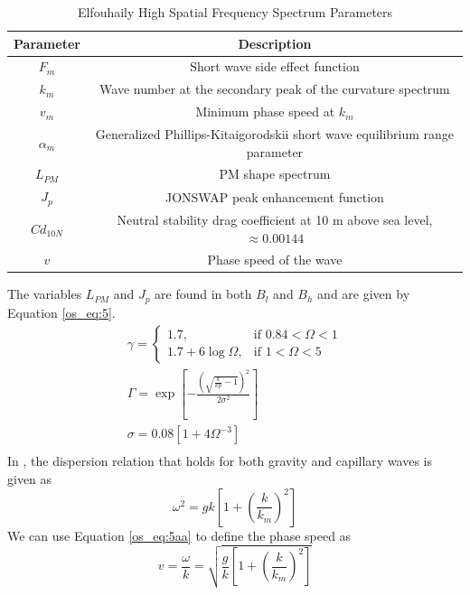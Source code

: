\begin{table}[H]
  \begin{center}
      \renewcommand{\baselinestretch}{1} \small\normalsize
  \begin{quote}
    \caption[Elfouhaily High Spatial Frequency Spectrum Parameters]{Elfouhaily High Spatial Frequency Spectrum Parameters\label{os_tab:2}}
  \end{quote}
  \begin{tabular} {|c | c |}
    \hline
  \bf{Parameter} & \bf{Description} \\ \hline
  $F_m$ & Short wave side effect function \\ \hline
  $k_m$ &  Wave number at the secondary peak of the curvature spectrum \\ \hline
  $v_m$ &  Minimum phase speed at $k_m$ \\ \hline
  $\alpha_m$ & Generalized Phillips-Kitaigorodskii short wave equilibrium range parameter \\ \hline
  $L_{PM}$ & PM shape spectrum \\ \hline
  $J_p$ & JONSWAP peak enhancement function \\ \hline
  $Cd_{10N}$ & Neutral stability drag coefficient at 10 m above sea level, $\approx 0.00144$ \\ \hline
  $v$ & Phase speed of the wave \\ \hline
\end{tabular}
\end{center}
\end{table}
\renewcommand{\baselinestretch}{2} \small\normalsize
The variables $L_{PM}$ and $J_p$ are found in both $B_l$ and $B_h$ and are given by Equation \ref{os_eq:5}.
\begin{equation}
\begin{gathered}
  \label{os_eq:5}
    \gamma = \begin{cases}
    1.7,& \text{if } 0.84 < \Omega < 1\\
    1.7 + 6\log{\Omega}, & \text{if } 1 < \Omega < 5
  \end{cases} \\
  \Gamma = \exp{\left[- \frac{\left(\sqrt{\frac{k}{kp} - 1} \right)^2}{2\sigma^2} \right]} \\
  \sigma = 0.08\left[1 + 4\Omega^{-3} \right] \\
\end{gathered}
\end{equation}
\renewcommand{\baselinestretch}{2} \small\normalsize
In \cite{elfouhaily}, the dispersion relation that holds for both gravity and capillary waves is given as 
\begin{equation}
\label{os_eq:5aa}
\omega^2 = gk\left[1 + \left(\frac{k}{k_m}\right)^2 \right]
\end{equation}
We can use Equation \ref{os_eq:5aa} to define the phase speed as
\begin{equation}
\label{os_eq:5ab}
v = \frac{\omega}{k}= \sqrt{\frac{g}{k}\left[1 + \left(\frac{k}{k_m}\right)^2 \right]}
\end{equation}

